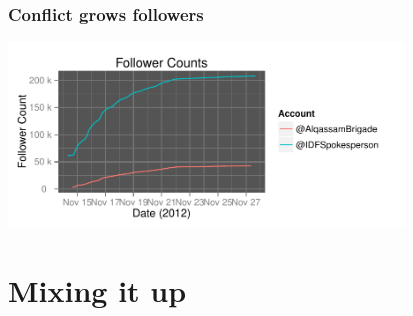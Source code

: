 \documentclass{beamer}
\begin{document}
\begin{frame}\frametitle{Conflict grows followers}
  \begin{center}
    \includegraphics[width=10.5cm]{./imgs/HI_minimal-followers.pdf}
  \end{center}
\end{frame}


%

\section{Mixing it up}
{
\begin{frame}
\textcolor{black} {
\Huge \hfill \insertsection}
\end{frame}
}
\end{document}
